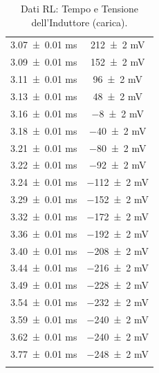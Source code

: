 \documentclass[a4paper]{article}
\begin{document}
\begin{appendices}
\begin{table}[htbp]
\begin{minipage}{0.48\textwidth}
\begin{tabular}{|c|c|}
        \num{3.07  \pm 0.01} \si{\milli\second} & \num{212 \pm 2} \si{\milli\volt} \\
        \num{3.09  \pm 0.01} \si{\milli\second} & \num{152 \pm 2} \si{\milli\volt} \\
        \num{3.11  \pm 0.01} \si{\milli\second} & \num{96  \pm 2} \si{\milli\volt} \\
        \num{3.13  \pm 0.01} \si{\milli\second} & \num{48  \pm 2} \si{\milli\volt} \\
        \num{3.16  \pm 0.01} \si{\milli\second} & \num{-8  \pm 2} \si{\milli\volt} \\
        \num{3.18  \pm 0.01} \si{\milli\second} & \num{-40 \pm 2} \si{\milli\volt} \\
        \num{3.21  \pm 0.01} \si{\milli\second} & \num{-80 \pm 2} \si{\milli\volt} \\
        \num{3.22  \pm 0.01} \si{\milli\second} & \num{-92 \pm 2} \si{\milli\volt} \\
        \num{3.24  \pm 0.01} \si{\milli\second} & \num{-112 \pm 2} \si{\milli\volt} \\
        \num{3.29  \pm 0.01} \si{\milli\second} & \num{-152 \pm 2} \si{\milli\volt} \\
        \num{3.32  \pm 0.01} \si{\milli\second} & \num{-172 \pm 2} \si{\milli\volt} \\
        \num{3.36  \pm 0.01} \si{\milli\second} & \num{-192 \pm 2} \si{\milli\volt} \\
        \num{3.40  \pm 0.01} \si{\milli\second} & \num{-208 \pm 2} \si{\milli\volt} \\
        \num{3.44  \pm 0.01} \si{\milli\second} & \num{-216 \pm 2} \si{\milli\volt} \\
        \num{3.49  \pm 0.01} \si{\milli\second} & \num{-228 \pm 2} \si{\milli\volt} \\
        \num{3.54  \pm 0.01} \si{\milli\second} & \num{-232 \pm 2} \si{\milli\volt} \\
        \num{3.59  \pm 0.01} \si{\milli\second} & \num{-240 \pm 2} \si{\milli\volt} \\
        \num{3.62  \pm 0.01} \si{\milli\second} & \num{-240 \pm 2} \si{\milli\volt} \\
        \num{3.77  \pm 0.01} \si{\milli\second} & \num{-248 \pm 2} \si{\milli\volt} \\
        \hline
        \multicolumn{2}{c}{\rule{0pt}{25.5ex}} %
        \end{tabular}
       \caption{Dati RL: Tempo e Tensione dell'Induttore (carica).}
       \label{tab:rl_data_carica_l}
    \end{minipage}
\end{table}


\end{appendices}
\end{document}
